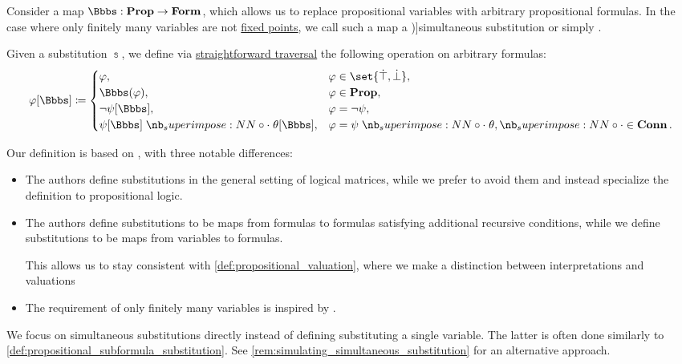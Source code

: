 \begin{definition}\label{def:propositional_substitution}\mimprovised
  Consider a map \( \Bbbs: \op*{Prop} \to \op*{Form} \), which allows us to replace propositional variables with arbitrary propositional formulas. In the case where only finitely many variables are not \hyperref[def:function_fixed_point]{fixed points}, we call such a map a \term[ru=одновременная замена (\cite[23]{Герасимов2011Вычислимость})]{simultaneous substitution} or simply .

  Given a substitution \( \Bbbs \), we define via \hyperref[rem:straightforward_traversal]{straightforward traversal} the following operation on arbitrary formulas:
  \begin{equation*}
    \varphi[\Bbbs] \coloneqq \begin{cases}
      \varphi,                            &\varphi \in \set{ \syntop, \synbot }, \\
      \Bbbs(\varphi),                     &\varphi \in \op*{Prop}, \\
      \neg \psi[\Bbbs],                   &\varphi = \neg \psi, \\
      \psi[\Bbbs] \syncirc \theta[\Bbbs], &\varphi = \psi \syncirc \theta, {\syncirc} \in \op*{Conn}. \\
    \end{cases}
  \end{equation*}
\end{definition}
\begin{comments}
  \item Our definition is based on , with three notable differences:
  \begin{itemize}
    \item The authors define substitutions in the general setting of logical matrices, while we prefer to avoid them and instead specialize the definition to propositional logic.

    \item The authors define substitutions to be maps from formulas to formulas satisfying additional recursive conditions, while we define substitutions to be maps from variables to formulas.

    This allows us to stay consistent with \cref{def:propositional_valuation}, where we make a distinction between interpretations and valuations

    \item The requirement of only finitely many variables is inspired by .
  \end{itemize}

  \item We focus on simultaneous substitutions directly instead of defining substituting a single variable. The latter is often done similarly to \cref{def:propositional_subformula_substitution}. See \cref{rem:simulating_simultaneous_substitution} for an alternative approach.
\end{comments}

